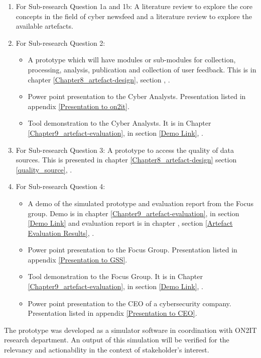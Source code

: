 \begin{enumerate}
   \item For Sub-research Question 1a and 1b: A literature review to explore the core concepts in the field of cyber newsfeed and   a literature review to explore the available artefacts.
       
  
    
    \item For Sub-research Question 2: 
    \begin{itemize}
        \item  A prototype which will have modules or sub-modules for collection, processing, analysis, publication and collection of user feedback. This is in chapter \ref{Chapter8_artefact-design}, section \label{New artefact prototype}, .
        \item Power point presentation to the Cyber Analysts. Presentation listed in appendix \ref{Presentation to on2it}.
        \item Tool demonstration to the Cyber Analysts. It is in Chapter \ref{Chapter9_artefact-evaluation},  in section \ref{Demo Link},  .
        
    \end{itemize}
    
   
     \item For Sub-research Question 3: A prototype to access the quality of data sources. This is presented in chapter \ref{Chapter8_artefact-design} section \ref{quality_source}, .
    \item For Sub-research Question 4:
    \begin{itemize}
    \item A demo of the simulated prototype and evaluation  report from the Focus group. Demo is in chapter  \ref{Chapter9_artefact-evaluation},  in section \ref{Demo Link} and evaluation report is in chapter , section \ref{Artefact Evaluation Results}, . 
     \item Power point presentation to the Focus Group. Presentation listed in appendix  \ref{Presentation to GSS}.
        \item Tool demonstration to the Focus Group. It is in Chapter \ref{Chapter9_artefact-evaluation},  in section \ref{Demo Link},  .
        \item Power point presentation to the CEO of a cybersecurity company. Presentation listed in appendix \ref{Presentation to CEO}.
       
     \end{itemize}
\end{enumerate}
The prototype was developed as a simulator software in coordination with ON2IT research department. An output of this simulation will be verified for the relevancy and actionability in the context of stakeholder’s interest.

